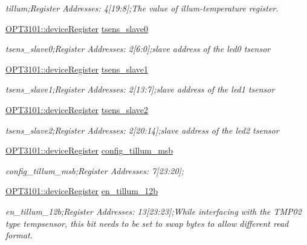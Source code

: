 \begin{DoxyCompactItemize}
\begin{DoxyCompactList}\small\item\em tillum;Register Addresses\+: 4\mbox{[}19\+:8\mbox{]};The value of illum-\/temperature register. \end{DoxyCompactList}\item 
\mbox{\hyperlink{class_o_p_t3101_1_1device_register}{O\+P\+T3101\+::device\+Register}} \mbox{\hyperlink{class_o_p_t3101_1_1registers_a514790a474a760e4f219616fb9e9d31e}{tsens\+\_\+slave0}}
\begin{DoxyCompactList}\small\item\em tsens\+\_\+slave0;Register Addresses\+: 2\mbox{[}6\+:0\mbox{]};slave address of the led0 tsensor \end{DoxyCompactList}\item 
\mbox{\hyperlink{class_o_p_t3101_1_1device_register}{O\+P\+T3101\+::device\+Register}} \mbox{\hyperlink{class_o_p_t3101_1_1registers_a94012adba7928a2dd4f764efcf8ad177}{tsens\+\_\+slave1}}
\begin{DoxyCompactList}\small\item\em tsens\+\_\+slave1;Register Addresses\+: 2\mbox{[}13\+:7\mbox{]};slave address of the led1 tsensor \end{DoxyCompactList}\item 
\mbox{\hyperlink{class_o_p_t3101_1_1device_register}{O\+P\+T3101\+::device\+Register}} \mbox{\hyperlink{class_o_p_t3101_1_1registers_ab50ce258e2b0c94a27d84ee66f69d683}{tsens\+\_\+slave2}}
\begin{DoxyCompactList}\small\item\em tsens\+\_\+slave2;Register Addresses\+: 2\mbox{[}20\+:14\mbox{]};slave address of the led2 tsensor \end{DoxyCompactList}\item 
\mbox{\hyperlink{class_o_p_t3101_1_1device_register}{O\+P\+T3101\+::device\+Register}} \mbox{\hyperlink{class_o_p_t3101_1_1registers_aff40151c7529d843cff4dc85778231e1}{config\+\_\+tillum\+\_\+msb}}
\begin{DoxyCompactList}\small\item\em config\+\_\+tillum\+\_\+msb;Register Addresses\+: 7\mbox{[}23\+:20\mbox{]}; \end{DoxyCompactList}\item 
\mbox{\hyperlink{class_o_p_t3101_1_1device_register}{O\+P\+T3101\+::device\+Register}} \mbox{\hyperlink{class_o_p_t3101_1_1registers_abe4ccad679c565e56f9c88de42904ef8}{en\+\_\+tillum\+\_\+12b}}
\begin{DoxyCompactList}\small\item\em en\+\_\+tillum\+\_\+12b;Register Addresses\+: 13\mbox{[}23\+:23\mbox{]};While interfacing with the T\+M\+P02 type tempsensor, this bit needs to be set to swap bytes to allow different read format. \end{DoxyCompactList}\item 

\end{DoxyCompactItemize}
